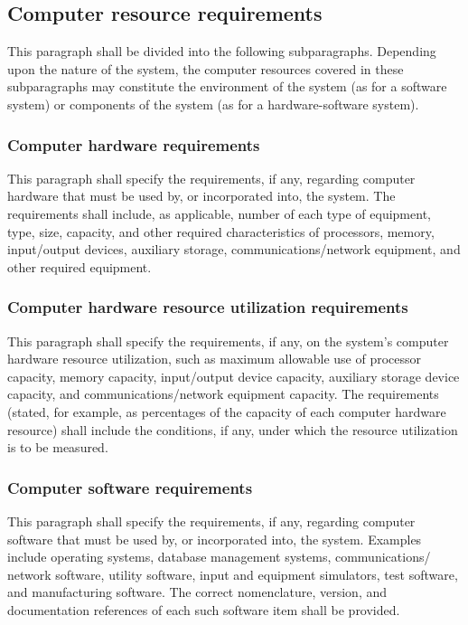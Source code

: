 \subsection{Computer resource requirements}

This paragraph shall be divided into the following subparagraphs.
Depending upon the nature of the system, the computer resources covered
in these subparagraphs may constitute the environment of the system (as
for a software system) or components of the system (as for a
hardware-software system).

\subsubsection{Computer hardware requirements}

This paragraph shall specify the requirements, if any, regarding
computer hardware that must be used by, or incorporated into, the
system. The requirements shall include, as applicable, number of each
type of equipment, type, size, capacity, and other required
characteristics of processors, memory, input/output devices, auxiliary
storage, communications/network equipment, and other required equipment.

\subsubsection{Computer hardware resource utilization
requirements}

This paragraph shall specify the requirements, if any, on the system's
computer hardware resource utilization, such as maximum allowable use of
processor capacity, memory capacity, input/output device capacity,
auxiliary storage device capacity, and communications/network equipment
capacity. The requirements (stated, for example, as percentages of the
capacity of each computer hardware resource) shall include the
conditions, if any, under which the resource utilization is to be
measured.

\subsubsection{Computer software requirements}

This paragraph shall specify the requirements, if any, regarding
computer software that must be used by, or incorporated into, the
system. Examples include operating systems, database management systems,
communications/ network software, utility software, input and equipment
simulators, test software, and manufacturing software. The correct
nomenclature, version, and documentation references of each such
software item shall be provided.


